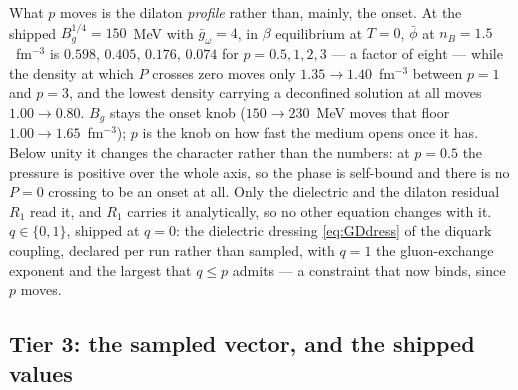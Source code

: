 \documentclass[11pt,a4paper]{article}
\begin{document}
What $p$ moves is the dilaton \emph{profile} rather than, mainly, the onset.
At the shipped $B_g^{1/4}=150$~MeV with $\bar g_\omega=4$, in $\beta$
equilibrium at $T=0$, $\bar\phi$ at $n_B=1.5$~fm$^{-3}$ is $0.598$, $0.405$,
$0.176$, $0.074$ for $p=0.5,1,2,3$ --- a factor of eight --- while the density
at which $P$ crosses zero moves only $1.35\to1.40$~fm$^{-3}$ between $p=1$ and
$p=3$, and the lowest density carrying a deconfined solution at all moves
$1.00\to0.80$. $B_g$ stays the onset knob ($150\to230$~MeV moves that floor
$1.00\to1.65$~fm$^{-3}$); $p$ is the knob on how fast the medium opens once it
has. Below unity it changes the character rather than the numbers: at $p=0.5$
the pressure is positive over the whole axis, so the phase is self-bound and
there is no $P=0$ crossing to be an onset at all.
Only the dielectric and the dilaton
residual $R_1$ read it, and $R_1$ carries it analytically, so no other equation
changes with it. $q\in\{0,1\}$, shipped at $q=0$: the dielectric dressing
\eqref{eq:GDdress} of the diquark coupling, declared per run rather than
sampled, with $q=1$ the gluon-exchange exponent and the largest that $q\le p$
admits --- a constraint that now binds, since $p$ moves.

\subsection{Tier 3: the sampled vector, and the shipped values}
\end{document}
